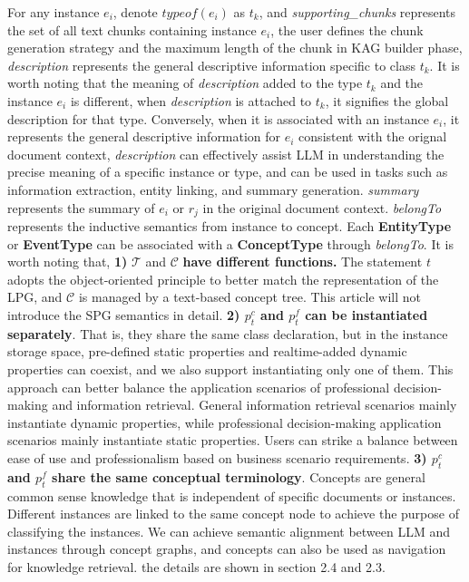 \documentclass{article}
\begin{document}
 For any instance $e_{i}$, denote $typeof(e_{i})$ as $t_{k}$, and \textit{supporting\_chunks} represents the set of all text chunks containing instance ${e_{i}}$, the user defines the chunk generation strategy and the maximum length of the chunk in KAG builder phase, \textit{description} represents the general descriptive information specific to class ${t_{k}}$. It is worth noting that the meaning of \textit{description} added to the type ${t_{k}}$ and the instance ${e_{i}}$ is different, when \textit{description} is attached to ${t_{k}}$, it signifies the global description for that type. Conversely, when it is associated with an instance ${e_{i}}$, it represents the general descriptive information for ${e_{i}}$ consistent with the orignal document context, \textit{description} can effectively assist LLM in understanding the precise meaning of a specific instance or type, and can be used in tasks such as information extraction, entity linking, and summary generation. \textit{summary} represents the summary of ${e_{i}}$ or ${r_{j}}$ in the original document context. \textit{belongTo} represents the inductive semantics from instance to concept. Each \textbf{EntityType} or \textbf{EventType} can be associated with a \textbf{ConceptType} through \textit{belongTo}. It is worth noting that, \textbf{1)} $\mathcal{T}$ and $\mathcal{C}$ \textbf{have different functions.} The statement ${t}$ adopts the object-oriented principle to better match the representation of the LPG\cite{sharma2019schema}, and $\mathcal{C}$ is managed by a text-based concept tree. This article will not introduce the SPG semantics in detail. \textbf{2) $p_{t}^{c}$ and $p_{t}^{f}$ can be instantiated separately}. That is, they share the same class declaration, but in the instance storage space, pre-defined static properties and realtime-added dynamic properties can coexist, and we also support instantiating only one of them. This approach can better balance the application scenarios of professional decision-making and information retrieval. General information retrieval scenarios mainly instantiate dynamic properties, while professional decision-making application scenarios mainly instantiate static properties. Users can strike a balance between ease of use and professionalism based on business scenario requirements. \textbf{3) $p_{t}^{c}$ and $p_{t}^{f}$ share the same conceptual terminology}. Concepts are general common sense knowledge that is independent of specific documents or instances. Different instances are linked to the same concept node to achieve the purpose of classifying the instances. We can achieve semantic alignment between LLM and  instances through concept graphs, and concepts can also be used as navigation for knowledge retrieval. the details are shown in section 2.4 and 2.3. \newline
\end{document}
